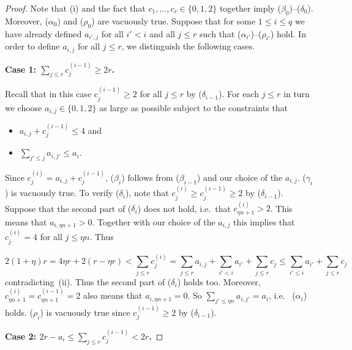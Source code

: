 \documentclass{memo-l}
\def\COMMENT#1{}
\numberwithin{section}{chapter}
\numberwithin{equation}{section}
\numberwithin{firstthm}{section}
\numberwithin{figure}{section}
\begin{document}
{\begin{proof}
Note that (i) and the fact that $c_1, \dots, c_r \in \{0,1,2\}$ together imply ($\beta_0$)--($\delta_0$).
Moreover, ($\alpha_0$) and ($\rho_0$) are vacuously true.
Suppose that for some $1\le i\le q$ we have already defined $a_{i',j}$ for all $i'<i$ and all $j\le r$ such that ($\alpha_{i'}$)--($\rho_{i'}$) hold.
In order to define $a_{i,j}$ for all $j\le r$, we distinguish the following cases.

\medskip 

\noindent\textbf{Case 1: $\sum_{j \le r} c^{(i-1)}_j \ge 2r$.}

\smallskip

\noindent Recall that in this case $c^{(i-1)}_j \ge 2$ for all $j \le r$ by ($\delta_{i-1}$).
For each $j\le r$ in turn we choose $a_{i,j}\in \{0,1,2\}$ as large as possible subject to the constraints
that
\begin{itemize}
\item $a_{i,j}+ c^{(i-1)}_j\le 4$ and
\item $\sum_{j'\le j} a_{i,j'}\le a_i$.
\end{itemize}
Since $c^{(i)}_j=a_{i,j}+ c^{(i-1)}_j$, ($\beta_i$) follows from ($\beta_{i-1}$) and our choice of the $a_{i,j}$.
($\gamma_i$) is vacuously true. To verify ($\delta_i$), note that $c_j^{(i)} \ge c_j^{(i-1)}\ge 2$ by ($\delta_{i-1}$).
Suppose that the second part of ($\delta_{i}$) does not hold, i.e.~that $c_{\eta n+1}^{(i)}>2$.
This means that $a_{i,\eta n+1}>0$.
Together with our choice of the $a_{i,j}$ this implies that $c_j^{(i)}=4$ for all $j\le \eta n$.
Thus%
   \COMMENT{We can't replace $\le$ by $=$ since at the moment we only know that $\sum_{j\le r} a_{i,j}\le a_i$.}
$$
2(1+\eta) r  =4\eta r+2(r-\eta r)< \sum_{j\le r} c^{(i)}_j=\sum_{j\le r} a_{i,j}+\sum_{i'<i} a_{i'}+ \sum_{j\le r} c_j
\le \sum_{i'\le i} a_{i'}+ \sum_{j\le r} c_j
$$
contradicting~(ii). Thus the second part of ($\delta_{i}$) holds too. Moreover, 
$c_{\eta n+1}^{(i)}=c_{\eta n+1}^{(i-1)}=2$ also means that $a_{i,\eta n+1}=0$.
So $\sum_{j'\le \eta n} a_{i,j'}= a_i$, i.e.~ ($\alpha_i$) holds. ($\rho_i$) is vacuously true since $c^{(i-1)}_j \ge 2$ by ($\delta_{i-1}$).

\medskip

\noindent\textbf{Case 2: $2r - a_i  \le \sum_{j \le r} c^{(i-1)}_j < 2r$.}

\smallskip


\end{proof}}
\end{document}
